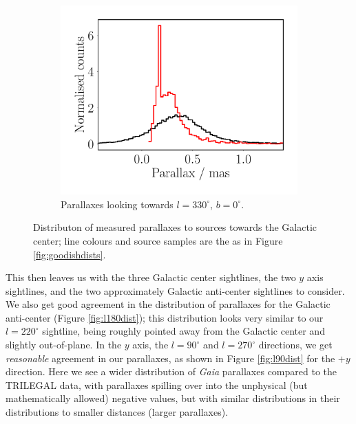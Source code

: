 \documentclass[fleqn,usenatbib]{mnras}
\begin{document}
\begin{figure}
\begin{subfigure}[b]{0.3\textwidth}
        \label{fig:l30dist}
    \end{subfigure}
    \begin{subfigure}[b]{0.3\textwidth}
        \centering
        \includegraphics[width=\textwidth]{Plots/plot_dist_gaia_330_0_18.pdf}
        \caption{Parallaxes looking towards $l = 330^\circ$, $b = 0^\circ$.}
        \label{fig:l330dist}
    \end{subfigure}
    \caption{Distributon of measured parallaxes to sources towards the Galactic center; line colours and source samples are the as in Figure \ref{fig:goodishdists}.}
    \label{fig:badishdists}
\end{figure}

This then leaves us with the three Galactic center sightlines, the two $y$ axis sightlines, and the two approximately Galactic anti-center sightlines to consider. We also get good agreement in the distribution of parallaxes for the Galactic anti-center (Figure \ref{fig:l180dist}); this distribution looks very similar to our $l = 220^\circ$ sightline, being roughly pointed away from the Galactic center and slightly out-of-plane. In the $y$ axis, the $l = 90^\circ$ and $l = 270^\circ$ directions, we get \textit{reasonable} agreement in our parallaxes, as shown in Figure \ref{fig:l90dist} for the $+y$ direction. Here we see a wider distribution of \textit{Gaia} parallaxes compared to the TRILEGAL data, with parallaxes spilling over into the unphysical (but mathematically allowed) negative values, but with similar distributions in their distributions to smaller distances (larger parallaxes).
\end{document}
